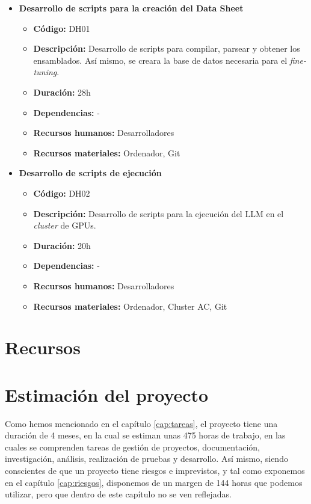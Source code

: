 
\begin{itemize}
    \item \textbf{Desarrollo de scripts para la creación del Data Sheet}
        \begin{itemize}
            \item \textbf{Código:} DH01
            \item \textbf{Descripción:} Desarrollo de scripts para compilar, parsear y obtener los ensamblados. Así mismo, se creara la base de datos
                necesaria para el \textit{fine-tuning}.
            \item \textbf{Duración:} 28h
            \item \textbf{Dependencias:} -
            \item \textbf{Recursos humanos:} Desarrolladores
            \item \textbf{Recursos materiales:} Ordenador, Git
        \end{itemize}
    \item \textbf{Desarrollo de scripts de ejecución}
        \begin{itemize}
            \item \textbf{Código:} DH02
            \item \textbf{Descripción:} Desarrollo de scripts para la ejecución del LLM en el \textit{cluster} de GPUs.
            \item \textbf{Duración:} 20h
            \item \textbf{Dependencias:} -
            \item \textbf{Recursos humanos:} Desarrolladores
            \item \textbf{Recursos materiales:} Ordenador, Cluster AC, Git
        \end{itemize}
\end{itemize}

\section{Recursos}
\label{subsec:recursos}

\section{Estimación del proyecto}
\label{sec:estimacion}


Como hemos mencionado en el capítulo \ref{cap:tareas}, el proyecto tiene una duración de 4 meses, en la cual se estiman unas 475 horas de trabajo, en las cuales se
comprenden tareas de gestión de proyectos, documentación, investigación, análisis, realización de pruebas y desarrollo. Así mismo, siendo conscientes de que un proyecto
tiene riesgos e imprevistos, y tal como exponemos en el capítulo \ref{cap:riesgos}, disponemos de un margen de 144 horas que podemos utilizar, pero que dentro de este
capítulo no se ven reflejadas.


